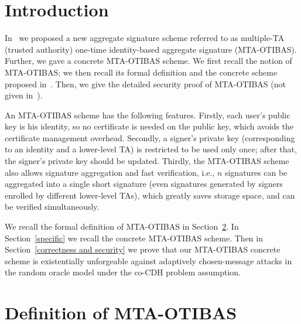 \documentclass[10pt,journal,compsoc]{IEEEtran}
\begin{document}
\IEEEdisplaynontitleabstractindextext

\IEEEpeerreviewmaketitle


\section{Introduction}



In~\cite{IEEE-T-ITS} we proposed a new
aggregate signature scheme
referred to as multiple-TA (trusted authority) one-time
identity-based aggregate signature (MTA-OTIBAS). Further,
we gave a concrete MTA-OTIBAS scheme.
We first recall the notion of MTA-OTIBAS;
we then recall its formal definition and the concrete scheme
proposed in~\cite{IEEE-T-ITS}.
Then, we give the detailed security proof
of MTA-OTIBAS (not given in~\cite{IEEE-T-ITS}).

An MTA-OTIBAS scheme has the following
features. Firstly, each user's public key is his identity, so no
certificate is needed on the public key, which avoids the
certificate management overhead. Secondly, a signer's private key
(corresponding to an identity and a lower-level TA) is restricted to
be used only once; after that, the signer's private key should be
updated. Thirdly,
the MTA-OTIBAS scheme also allows signature
aggregation and fast verification, i.e., $n$ signatures can be
aggregated into a single short signature (even signatures generated
by signers enrolled by different lower-level TAs), which greatly saves storage space, and can be
verified simultaneously.

We recall the formal definition of MTA-OTIBAS in Section~\ref{IBC}.
In Section~\ref{specific} we recall the concrete MTA-OTIBAS scheme.
Then in Section~\ref{correctness and
security} we prove that
our MTA-OTIBAS concrete scheme is existentially
unforgeable against adaptively chosen-message attacks in
the random oracle model under the co-CDH problem
assumption.


\section{Definition of MTA-OTIBAS}\label{IBC}
\end{document}
